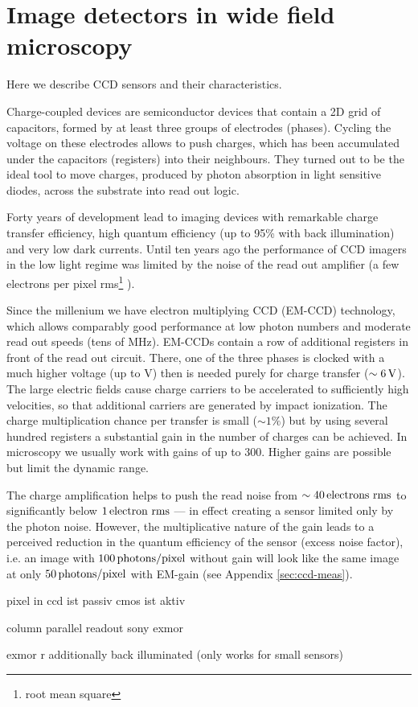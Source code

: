 \section{Image detectors in wide field microscopy}
\label{sec:ccd-intro}
\begin{summary}
  Here we describe CCD
  sensors and their characteristics.
\end{summary}
Charge-coupled devices are semiconductor devices that contain a 2D
grid of capacitors, formed by at least three groups of electrodes
(phases). Cycling the voltage on these electrodes allows to push
charges, which has been accumulated under the capacitors (registers)
into their neighbours. They turned out to be the ideal tool to move
charges, produced by photon absorption in light sensitive diodes,
across the substrate into read out logic.

Forty years of development lead to imaging devices with remarkable
charge transfer efficiency, high quantum efficiency (up to 95\% with
back illumination) and very low dark currents. Until ten years ago the
performance of CCD imagers in the low light regime was limited by the
noise of the read out amplifier (a few electrons per pixel
rms\footnote{root mean square} ).

Since the millenium we have electron multiplying CCD (EM-CCD)
 technology,
which allows comparably good performance at low photon numbers
\citep{Mackay,Robbins2003} and moderate read out speeds (tens of
MHz). EM-CCDs contain a row of additional registers in front of the
read out circuit. There, one of the three phases is clocked with a
much higher voltage (up to \unit[40]{V}) then is needed purely for
charge transfer ($\unit[\sim6]{V}$). The large electric fields cause
charge carriers to be accelerated to sufficiently high velocities, so
that additional carriers are generated by impact ionization. The
charge multiplication chance per transfer is small ($\sim1\%$) but by
using several hundred registers a substantial gain in the number of
charges can be achieved. In microscopy we usually work with gains of
up to 300. Higher gains are possible but limit the dynamic range.

The charge amplification helps to push the read noise from
$\sim\unit[40]{electrons\ rms}$ to significantly below
$\unit[1]{electron\ rms}$ --- in effect creating a sensor limited only
by the photon noise. However, the multiplicative nature of the gain
leads to a perceived reduction in the quantum efficiency of the sensor
(excess noise factor), i.e. an image with $\unit[100]{photons/pixel}$
without gain will look like the same image at only
$\unit[50]{photons/pixel}$ with EM-gain (see Appendix
\ref{sec:ccd-meas}).


pixel in
ccd ist passiv
cmos ist aktiv

column parallel readout sony exmor

exmor r additionally back illuminated (only works for small sensors)

